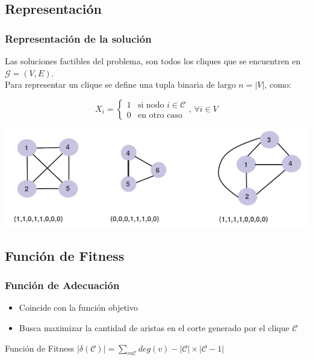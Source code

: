 \subsection{Representación}
\begin{frame}\frametitle{Representación de la solución}

    \begin{small}
    Las soluciones factibles del problema, son todos los cliques que se encuentren en $\mathcal{G}= (V,E)$. \\
    Para representar un clique se define una tupla binaria de largo $n = |V|$, como: 
   
	\begin{displaymath}
    	X_{i} = 
    	\begin{cases}
      		1 & \text{si nodo } i \in \mathcal{C}\\
      		0 & \text{en otro caso}
    	\end{cases} \text{, } \forall i \in V 
	\end{displaymath}
    \end{small}
   	\begin{center}
    		\includegraphics[scale=0.5]{figuras/Solucion/representacionSol}
    \end{center}
\end{frame}

\subsection{Función de Fitness}
\begin{frame}\frametitle{Función de Adecuación}
\begin{itemize}
\item Coincide con la función objetivo  
\item Busca maximizar la cantidad de aristas en el corte generado por el clique $\mathcal{C}$
\end{itemize}

    \begin{block}{Función de Fitness} 
	$	
	|\delta(\mathcal{C})| = \sum_{v \epsilon \mathcal{C}} deg(v) - |\mathcal{C}|\times|\mathcal{C}-1|$  
    \end{block}
\end{frame}

